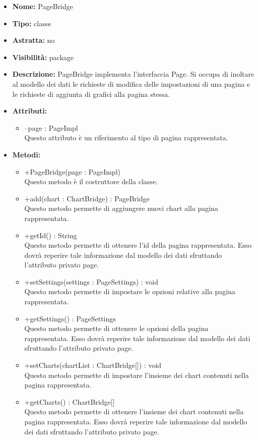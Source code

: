 			
			\begin{itemize}
			\item \textbf{Nome:} PageBridge
			\item \textbf{Tipo:} classe
			
		\item \textbf{Astratta:}
		no
			\item \textbf{Visibilità:} package
			\item \textbf{Descrizione:} PageBridge implementa l'interfaccia Page. Si occupa di inoltare al modello dei dati le richieste di modifica delle impostazioni di una pagina e le richieste di aggiunta di grafici alla pagina stessa.
			\item \textbf{Attributi:}
				\begin{itemize}
				\setlength{\itemsep}{5pt}
				
					\item[\ding{111}] {--page : PageImpl} \\ [1mm] Questo attributo è un riferimento al tipo di pagina rappresentata.
				\end{itemize}
		
			\item \textbf{Metodi:}
				\begin{itemize}
				\setlength{\itemsep}{5pt}
				
					\item[\ding{111}] {{+PageBridge(page : PageImpl)}} \\ [1mm] Questo metodo è il costruttore della classe.	
					\item[\ding{111}] {{+add(chart : ChartBridge) : PageBridge}} \\ [1mm] Questo metodo permette di aggiungere nuovi chart alla pagina rappresentata.
					\item[\ding{111}] {{+getId() : String}} \\ [1mm] Questo metodo permette di ottenere l'id della pagina rappresentata.  Esso dovrà reperire tale informazione dal modello dei dati sfruttando l'attributo privato page.
					\item[\ding{111}] {{+setSettings(settings : PageSettings) : void}} \\ [1mm] Questo metodo permette di impostare le opzioni relative alla pagina rappresentata.
					\item[\ding{111}] {{+getSettings() : PageSettings}} \\ [1mm] Questo metodo permette di ottenere le opzioni della pagina rappresentata.  Esso dovrà reperire tale informazione dal modello dei dati sfruttando l'attributo privato page.
					\item[\ding{111}] {{+setCharts(chartList : ChartBridge[]) : void}} \\ [1mm] Questo metodo permette di impostare l'insieme dei chart contenuti nella pagina rappresentata.
					\item[\ding{111}] {{+getCharts() : ChartBridge[]}} \\ [1mm] Questo metodo permette di ottenere l'insieme dei chart contenuti nella pagina rappresentata. Esso dovrà reperire tale informazione dal modello dei dati sfruttando l'attributo privato page.
				\end{itemize}
		

\end{itemize}
